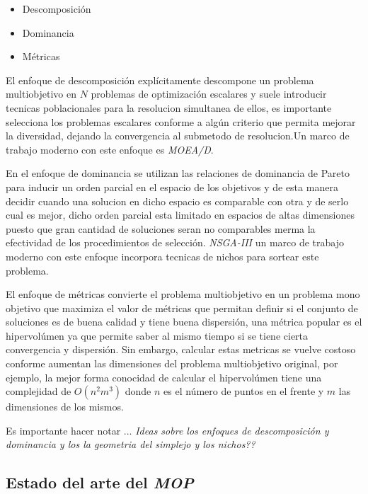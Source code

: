 \documentclass[letterpaper,10pt]{article}
\begin{document}
\begin{itemize}
 \item Descomposición
 \item Dominancia
 \item Métricas
\end{itemize}

El enfoque de descomposición explícitamente descompone un problema multiobjetivo en $N$ problemas de optimización escalares y suele introducir tecnicas poblacionales para la resolucion simultanea de ellos, es importante selecciona los problemas escalares conforme a algún criterio que permita mejorar la diversidad, dejando la convergencia al submetodo de resolucion.Un marco de trabajo moderno con este enfoque es \emph{MOEA/D}.
\newline

En el enfoque de dominancia se utilizan las relaciones de dominancia de Pareto para inducir un orden parcial en el espacio de los objetivos y de esta manera decidir cuando una solucion en dicho espacio es comparable con otra y de serlo cual es mejor, dicho orden parcial esta limitado en espacios de altas dimensiones puesto que gran cantidad de soluciones seran no comparables merma la efectividad de los procedimientos de selección. \emph{NSGA-III} un marco de trabajo moderno con este enfoque incorpora tecnicas de nichos para sortear este problema.
\newline

El enfoque de métricas convierte el problema multiobjetivo en un problema mono objetivo que maximiza el valor de métricas que permitan definir si el conjunto de soluciones es de buena calidad y  tiene buena dispersión, una métrica popular es el hipervolúmen ya que permite saber al mismo tiempo si se tiene cierta convergencia y dispersión. Sin embargo, calcular estas metricas se vuelve costoso conforme aumentan las dimensiones del problema multiobjetivo original, por ejemplo, la mejor forma conocidad de calcular el hipervolúmen tiene una complejidad de $O(n^2m^3)$ donde $n$ es el número de puntos en el frente y $m$ las dimensiones de los mismos. 
\newline

Es importante hacer notar ... \emph{Ideas sobre los enfoques de descomposición y dominancia y los la geometria del  simplejo y los nichos??} 
\newline

\subsection{Estado del arte del \emph{MOP}}
\end{document}
